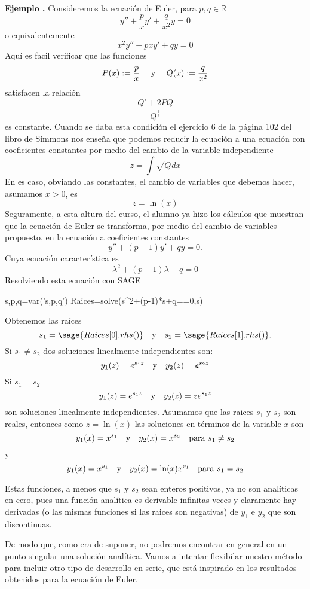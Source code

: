 \documentclass{article}
\newcounter{ejem_cont}
\newenvironment{ejemplo}[1]{\refstepcounter{ejem_cont}\vspace{1ex}\noindent\textbf{Ejemplo \arabic{ejem_cont}.} #1}{}
\newcounter{ejer_cont}
\newcommand{\rr}{\mathbb{R}}
\begin{document}
\begin{ejemplo} Consideremos la ecuación de Euler, para $p,q\in\rr$
\[y''+\frac{p}{x}y'+\frac{q}{x^2}y=0\]
o equivalentemente
\[x^2y''+pxy'+qy=0\]
Aquí es facil verificar que las funciones
\[P(x):=\frac{p}{x}\quad\hbox{ y }\quad Q(x):= \frac{q}{x^2}\]
satisfacen la relación
\[\frac{Q'+2PQ}{Q^{\frac{3}{2}}}\]
es constante. Cuando se daba esta condición el ejercicio 6 de la página 102 del libro de Simmons nos enseña que podemos reducir la ecuación a una ecuación con coeficientes constantes por medio del cambio de la variable independiente
\[z=\int\sqrt{Q}dx\]
En es caso, obviando las constantes, el cambio de variables que debemos hacer, asumamos $x>0$, es
\[z=\ln(x)\]
Seguramente, a esta altura del curso,  el alumno ya hizo los cálculos que muestran que la ecuación de Euler se transforma,  por medio del cambio de variables propuesto, en la ecuación a coeficientes constantes
\[y''+(p-1)y'+qy=0.\]
Cuya ecuación característica es
\[\lambda^2+(p-1)\lambda+q=0\]
Resolviendo esta ecuación con SAGE

\begin{sageblock}
s,p,q=var('s,p,q')
Raices=solve(s^2+(p-1)*s+q==0,s)
\end{sageblock}
Obtenemos las raíces 
\[s_1=\sage{Raices[0].rhs()}\quad\text{y}\quad s_2=\sage{Raices[1].rhs()}.\]
 Si $s_1\neq s_2$ dos soluciones linealmente independientes son:
\[y_1(z)=e^{s_1z}\quad\hbox{y}\quad y_2(z)=e^{s_2z}\]
 Si $s_1=s_2$
\[y_1(z)=e^{s_1z} \quad\hbox{y}\quad y_2(z)=ze^{s_1z}\]
son soluciones linealmente independientes. Asumamos que las raices $s_1$ y $s_2$ son reales, entonces como $z=\ln(x)$ las soluciones en términos de la variable $x$ son 
\[y_1(x)=x^{s_1}\quad\hbox{y}\quad y_2(x)=x^{s_2}\quad\text{para }  s_1\neq s_2\]
y
\[y_1(x)=x^{s_1} \quad\hbox{y}\quad y_2(x)=\ln(x)x^{s_1}\quad\text{para }  s_1= s_2\]



Estas funciones, a menos que $s_1$ y $s_2$ sean enteros positivos, ya no son analíticas en cero, pues una función analítica es derivable infinitas veces y claramente hay derivadas (o las mismas funciones si las raices son negativas) de $y_1$ e $y_2$ que son discontinuas. 
\end{ejemplo}


De modo que, como era de suponer, no podremos encontrar en general en un punto singular una solución analítica.  Vamos a intentar flexibilar nuestro método para incluir otro tipo de desarrollo en serie, que está inspirado en los resultados obtenidos para la ecuación de Euler. 
\end{document}
